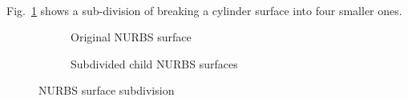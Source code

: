\paragraph{}
Fig.~\ref{oct_fig:nurbs_division} shows a sub-division of breaking a cylinder surface into four smaller ones.

\begin{figure}[h!]
    \centering
    \begin{subfigure}[b]{0.4\linewidth}
        \centering
        \caption{Original NURBS surface}
    \end{subfigure}
    \begin{subfigure}[b]{0.4\linewidth}
        \centering
        \caption{Subdivided child NURBS surfaces}
    \end{subfigure}
    \caption{NURBS surface subdivision}
    \label{oct_fig:nurbs_division}
\end{figure}
